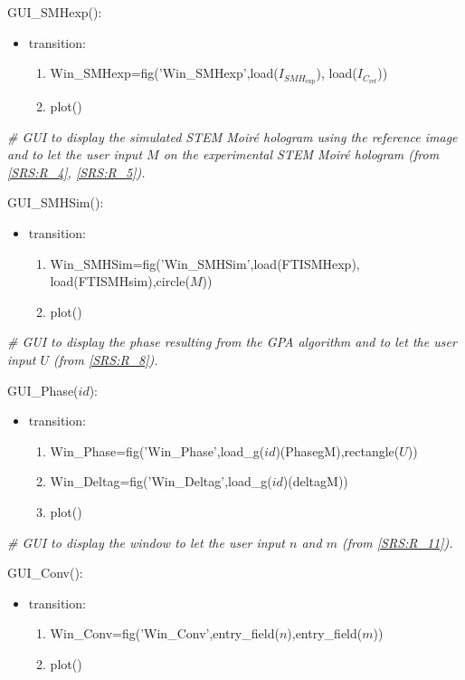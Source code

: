 \documentclass[12pt, titlepage]{article}
\begin{document}
\noindent GUI{\_}SMHexp():
\begin{itemize}
\item transition: 
	\begin{enumerate}
	\item Win{\_}SMHexp=fig('Win{\_}SMHexp',load($I_{\mathit{SMH}_{\text{exp}}}$), 
load($I_{C_{\text{ref}}}$))
	\item plot()
	\end{enumerate} 
\end{itemize}
\bigskip


\noindent\textit{{\#} GUI to display the simulated STEM Moir{\'e} hologram using 
the reference image and to let the user input $M$ on the experimental STEM 
Moir{\'e} hologram (from \cref{SRS:R_4}, \cref{SRS:R_5}).}\medskip

\noindent GUI{\_}SMHSim():
\begin{itemize}
\item transition: 
	\begin{enumerate}
	\item 
Win{\_}SMHSim=fig('Win{\_}SMHSim',load(FTISMHexp), \\ 
load(FTISMHsim),circle($M$))
	\item plot()
	\end{enumerate} 
\end{itemize}
\bigskip


\noindent\textit{{\#} GUI to display the phase resulting from the GPA algorithm 
and to let the user input $U$ (from \cref{SRS:R_8}).}\medskip

\noindent GUI{\_}Phase($id$):
\begin{itemize}
\item transition: 
	\begin{enumerate}
	\item Win{\_}Phase=fig('Win{\_}Phase',load{\_}g($id$)(PhasegM),rectangle($U$))
	\item Win{\_}Deltag=fig('Win{\_}Deltag',load{\_}g($id$)(deltagM))
	\item plot()
	\end{enumerate} 
\end{itemize}
\bigskip

\noindent\textit{{\#} GUI to display the window to let the user input $n$ and 
$m$ (from \cref{SRS:R_11}).}\medskip

\noindent GUI{\_}Conv():
\begin{itemize}
\item transition: 
	\begin{enumerate}
	\item Win{\_}Conv=fig('Win{\_}Conv',entry{\_}field($n$),entry{\_}field($m$))
	\item plot()
	\end{enumerate} 
\end{itemize}
\bigskip
\end{document}
